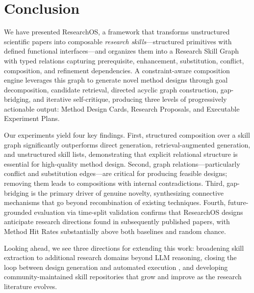 \section{Conclusion}
\label{sec:conclusion}

We have presented ResearchOS, a framework that transforms unstructured scientific papers into composable \emph{research skills}---structured primitives with defined functional interfaces---and organizes them into a Research Skill Graph with typed relations capturing prerequisite, enhancement, substitution, conflict, composition, and refinement dependencies. A constraint-aware composition engine leverages this graph to generate novel method designs through goal decomposition, candidate retrieval, directed acyclic graph construction, gap-bridging, and iterative self-critique, producing three levels of progressively actionable output: Method Design Cards, Research Proposals, and Executable Experiment Plans.

Our experiments yield four key findings. First, structured composition over a skill graph significantly outperforms direct generation, retrieval-augmented generation, and unstructured skill lists, demonstrating that explicit relational structure is essential for high-quality method design. Second, graph relations---particularly conflict and substitution edges---are critical for producing feasible designs; removing them leads to compositions with internal contradictions. Third, gap-bridging is the primary driver of genuine novelty, synthesizing connective mechanisms that go beyond recombination of existing techniques. Fourth, future-grounded evaluation via time-split validation confirms that ResearchOS designs anticipate research directions found in subsequently published papers, with Method Hit Rates substantially above both baselines and random chance.

Looking ahead, we see three directions for extending this work: broadening skill extraction to additional research domains beyond LLM reasoning, closing the loop between design generation and automated execution \cite{lu2024aiscientist}, and developing community-maintained skill repositories that grow and improve as the research literature evolves.
